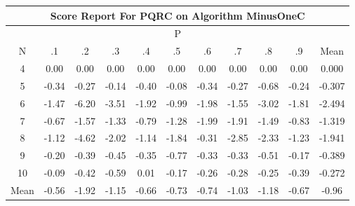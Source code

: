 \documentclass[11pt,a4paper]{report}
\begin{document}
\begin{longtable}{ | c || c | c | c | c | c | c | c | c | c || c |}
\hline
\multicolumn{11}{|c|}{ Score Report For PQRC on Algorithm MinusOneC} \\
\hline
\multicolumn{11}{|c|}{ P } \\
\hline
N & .1 & .2 & .3 & .4 & .5 & .6 & .7 & .8 & .9 & Mean\\
 \hline
 \hline
 \endhead
  4 &  \cellcolor[HTML]{FFFFFF} 0.00 &  \cellcolor[HTML]{FFFFFF} 0.00 &  \cellcolor[HTML]{FFFFFF} 0.00 &  \cellcolor[HTML]{FFFFFF} 0.00 &  \cellcolor[HTML]{FFFFFF} 0.00 &  \cellcolor[HTML]{FFFFFF} 0.00 &  \cellcolor[HTML]{FFFFFF} 0.00 &  \cellcolor[HTML]{FFFFFF} 0.00 &  \cellcolor[HTML]{FFFFFF} 0.00 & 0.000 \\
  5 &  \cellcolor[HTML]{FFF7F7} -0.34 &  \cellcolor[HTML]{FFF7F7} -0.27 &  \cellcolor[HTML]{FFFFFF} -0.14 &  \cellcolor[HTML]{FFF7F7} -0.40 &  \cellcolor[HTML]{FFFFFF} -0.08 &  \cellcolor[HTML]{FFF7F7} -0.34 &  \cellcolor[HTML]{FFF7F7} -0.27 &  \cellcolor[HTML]{FFEFEF} -0.68 &  \cellcolor[HTML]{FFF7F7} -0.24 & -0.307 \\
  6 &  \cellcolor[HTML]{FFD7D7} -1.47 &  \cellcolor[HTML]{FF6060} -6.20 &  \cellcolor[HTML]{FFA7A7} -3.51 &  \cellcolor[HTML]{FFCFCF} -1.92 &  \cellcolor[HTML]{FFE7E7} -0.99 &  \cellcolor[HTML]{FFCFCF} -1.98 &  \cellcolor[HTML]{FFD7D7} -1.55 &  \cellcolor[HTML]{FFAFAF} -3.02 &  \cellcolor[HTML]{FFCFCF} -1.81 & -2.494 \\
  7 &  \cellcolor[HTML]{FFEFEF} -0.67 &  \cellcolor[HTML]{FFD7D7} -1.57 &  \cellcolor[HTML]{FFDFDF} -1.33 &  \cellcolor[HTML]{FFE7E7} -0.79 &  \cellcolor[HTML]{FFDFDF} -1.28 &  \cellcolor[HTML]{FFCFCF} -1.99 &  \cellcolor[HTML]{FFCFCF} -1.91 &  \cellcolor[HTML]{FFD7D7} -1.49 &  \cellcolor[HTML]{FFE7E7} -0.83 & -1.319 \\
  8 &  \cellcolor[HTML]{FFDFDF} -1.12 &  \cellcolor[HTML]{FF8787} -4.62 &  \cellcolor[HTML]{FFCFCF} -2.02 &  \cellcolor[HTML]{FFDFDF} -1.14 &  \cellcolor[HTML]{FFCFCF} -1.84 &  \cellcolor[HTML]{FFF7F7} -0.31 &  \cellcolor[HTML]{FFB7B7} -2.85 &  \cellcolor[HTML]{FFC7C7} -2.33 &  \cellcolor[HTML]{FFDFDF} -1.23 & -1.941 \\
  9 &  \cellcolor[HTML]{FFF7F7} -0.20 &  \cellcolor[HTML]{FFF7F7} -0.39 &  \cellcolor[HTML]{FFF7F7} -0.45 &  \cellcolor[HTML]{FFF7F7} -0.35 &  \cellcolor[HTML]{FFEFEF} -0.77 &  \cellcolor[HTML]{FFF7F7} -0.33 &  \cellcolor[HTML]{FFF7F7} -0.33 &  \cellcolor[HTML]{FFEFEF} -0.51 &  \cellcolor[HTML]{FFF7F7} -0.17 & -0.389 \\
  10 &  \cellcolor[HTML]{FFFFFF} -0.09 &  \cellcolor[HTML]{FFF7F7} -0.42 &  \cellcolor[HTML]{FFEFEF} -0.59 &  \cellcolor[HTML]{FFFFFF} 0.01 &  \cellcolor[HTML]{FFF7F7} -0.17 &  \cellcolor[HTML]{FFF7F7} -0.26 &  \cellcolor[HTML]{FFF7F7} -0.28 &  \cellcolor[HTML]{FFF7F7} -0.25 &  \cellcolor[HTML]{FFF7F7} -0.39 & -0.272 \\
 \hline
 \hline
Mean &  \cellcolor[HTML]{FFEFEF} -0.56 &  \cellcolor[HTML]{FFCFCF} -1.92 &  \cellcolor[HTML]{FFDFDF} -1.15 &  \cellcolor[HTML]{FFEFEF} -0.66 &  \cellcolor[HTML]{FFEFEF} -0.73 &  \cellcolor[HTML]{FFEFEF} -0.74 &  \cellcolor[HTML]{FFE7E7} -1.03 &  \cellcolor[HTML]{FFDFDF} -1.18 &  \cellcolor[HTML]{FFEFEF} -0.67 &  \cellcolor[HTML]{FFE7E7} -0.96
\end{longtable}
\end{document}
